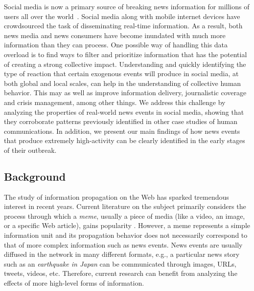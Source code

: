 Social media is now a primary source of breaking news information for millions
of users all over the
world~\cite{Kwak:2010,petrovic2013can,broersma2013twitter,tandoc2016most,Rogers:2013:DTT:2464464.2464511}.
%
Social media along with mobile internet devices have crowdsourced the
task of disseminating real-time information. 
%
As a result, both news media and news consumers have become inundated with much
more information than they can process. 
%
One possible way of handling this data overload is to find ways to filter and
prioritize information that has the potential of creating a strong collective
impact. 
%
Understanding and quickly identifying the type of reaction that certain
exogenous events will produce in social media, at both global and
local scales, can help in the understanding of collective human behavior.
%
This may as well as improve information delivery, journalistic coverage and
crisis management, among other things. 
%
We address this challenge by analyzing the properties of real-world news events
in social media, showing that they corroborate patterns previously identified in
other case studies of human communications. 
%
In addition, we present our main findings of how news events that produce
extremely high-activity can be clearly identified in the early stages of their
outbreak.

\subsection{Background}

The study of information propagation on the Web has sparked tremendous interest
in recent years. 
%
Current literature on the subject primarily considers the process through which
a {\em meme}, usually a piece of media (like a video, an image, or a specific
Web article), gains popularity
\cite{Castillo:2014,Szabo:2010,Lerman:2010,Tatar2014,Pinto:2013,Ahmed:2013,Li:2016:concept:drift,
Liu:2015:UN}. 
%
However, a meme represents a simple information unit and its propagation
behavior does not necessarily correspond to that of more complex information
such as news events. 
%
News events are usually diffused in the network in many different formats, e.g.,
a particular news story such as an {\em earthquake in Japan} can be communicated
through images, URLs, tweets, videos, etc. 
%
Therefore, current research can benefit from analyzing the effects of more
high-level forms of information. 

